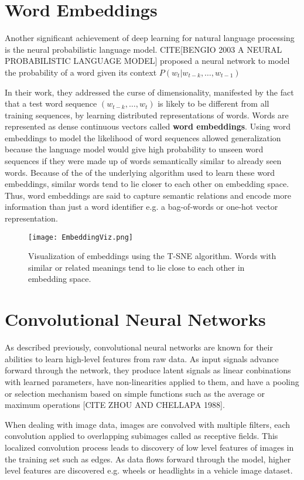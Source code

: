 \section{Word Embeddings}
Another significant achievement of deep learning for natural language processing is the neural probabilistic language model. CITE[BENGIO 2003 A NEURAL PROBABILISTIC LANGUAGE MODEL]
proposed a neural network to model the probability of a word given its context
$P(w_t|w_{t-k},\dots,w_{t-1})$

In their work, they addressed the curse of dimensionality, manifested by the fact that a test word sequence $(w_{t-k},\dots,w_{t})$
is likely to be different from all training sequences, by learning distributed representations of words. Words are represented as
dense continuous vectors called \textbf{word embeddings}.
Using word embeddings to model the likelihood of word sequences allowed generalization because the language model
would give high probability to unseen word sequences if they were made up of words semantically similar to already seen words.
Because of the of the underlying algorithm used to learn these word embeddings, similar words tend to lie closer to each other on
embedding space. Thus, word embeddings are said to capture semantic relations and encode more information than just a word identifier e.g.
a bag-of-words or one-hot vector representation.

\begin{figure}[h]
\caption{Visualization of embeddings using the T-SNE algorithm. Words with similar or related meanings
tend to lie close to each other in embedding space.}
\centering
\texttt{[image: EmbeddingViz.png]}
\end{figure}

\section{Convolutional Neural Networks}
As described previously, convolutional neural networks are known for their abilities to learn high-level features from raw data. As input signals advance
forward through the network, they produce latent signals as linear conbinations with learned parameters, have non-linearities applied
to them, and have a pooling or selection mechanism based on simple functions such as the average or maximum operations [CITE ZHOU AND CHELLAPA 1988].

When dealing with image data, images are convolved with multiple filters, each convolution applied to overlapping subimages called as receptive fields.
This localized convolution process leads to discovery of low level features of images in the training set such as edges. As data
flows forward through the model, higher level features are discovered e.g. wheels or headlights in a vehicle image dataset.

